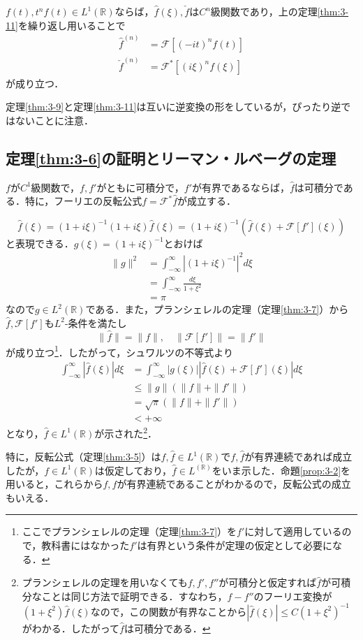 \documentclass[dvipdfmx,a4j,10pt]{jsarticle}
\makeatletter
\theoremstyle{mystyle1}
\theoremstyle{mystyle3}
\theoremstyle{mystyle4}
\theoremstyle{mystyle6}
\theoremstyle{mystyle2}
\theoremstyle{mystyle5}
\newtheorem{theorem*}{定理}
\renewenvironment{proof}[1][\proofname]{\par
  \pushQED{\qed}%
  \normalfont
  \topsep6\p@\@plus6\p@ \trivlist
  \item[\hskip\labelsep{\bfseries\sffamily #1}]\ignorespaces
}{%
  \popQED\endtrivlist\@endpefalse
}
\renewcommand\proofname{証明}
\newenvironment{thm*}[1][]
{\begin{tcolorbox}[
    enhanced,
    boxrule=0pt,
    arc=0mm,
    frame hidden,
    borderline west={2pt}{-4pt}{red},
    breakable = true
    ]
    \begin{theorem*}[#1]
}
{\end{theorem*}\end{tcolorbox}}
\makeatother
\begin{document}
$f(t),t^nf(t)\in L^1(\mathbb{R})$ならば，$\hat f(\xi),\check f$は$C^n$級関数であり，上の定理\ref{thm:3-11}を繰り返し用いることで
\[
	\begin{split}
		\hat f^{(n)}&=\mathcal{F}[(-it)^nf(t)] \\
		\check f^{(n)}&=\mathcal{F}^*[(i\xi)^n f(\xi)]
	\end{split}
\]
が成り立つ．

定理\ref{thm:3-9}と定理\ref{thm:3-11}は互いに逆変換の形をしているが，ぴったり逆ではないことに注意．


\subsection{定理\ref{thm:3-6}の証明とリーマン・ルベーグの定理}\label{sec:3-7}

\begin{thm*}
	$f$が$C^1$級関数で，$f,f'$がともに可積分で，$f'$が有界であるならば，$\hat f$は可積分である．特に，フーリエの反転公式$f=\mathcal{F}^*\hat f$が成立する．
\end{thm*}

\begin{proof}
	\[
		\hat f(\xi)	=(1+i\xi)^{-1}(1+i\xi)\hat f(\xi)=(1+i\xi)^{-1}(\hat f(\xi)+\mathcal{F}[f'](\xi))
	\]
	と表現できる．$g(\xi)=(1+i\xi)^{-1}$とおけば
	\[
		\begin{split}
			\|g\|^2&=\int_{-\infty}^\infty|(1+i\xi)^{-1}|^2d\xi \\
			&=\int_{-\infty}^\infty \frac{d\xi}{1+\xi^2} \\
			&=\pi
		\end{split}
	\]
	なので$g\in L^2(\mathbb{R})$である．また，プランシェレルの定理（定理\ref{thm:3-7}）から$\hat f,\mathcal{F}[f']$も$L^2$-条件を満たし
	\[
		\|\hat f\|=\|f\|,\quad\|\mathcal{F}[f']\|=\|f'\|
	\]
	が成り立つ\footnote{ここでプランシェレルの定理（定理\ref{thm:3-7}）を$f'$に対して適用しているので，教科書にはなかった$f'$は有界という条件が定理の仮定として必要になる．}．したがって，シュワルツの不等式より
	\[
		\begin{split}
			\int_{-\infty}^\infty|\hat f(\xi)|d\xi
			&=\int_{-\infty}^\infty |g(\xi)||\hat f(\xi)+\mathcal{F}[f'](\xi)|d\xi \\
			&\leq\|g\|(\|f\|+\|f'\|) \\
			&=\sqrt{\pi}(\|f\|+\|f'\|) \\
			&<+\infty
		\end{split}
	\]
	となり，$\hat f\in L^1(\mathbb{R})$が示された\footnote{プランシェレルの定理を用いなくても$f,f',f''$が可積分と仮定すれば$\hat f$が可積分なことは同じ方法で証明できる．すなわち，$f-f''$のフーリエ変換が$(1+\xi^2)\hat f(\xi)$なので，この関数が有界なことから$|\hat f(\xi)|\leq C(1+\xi^2)^{-1}$がわかる．したがって$\hat f$は可積分である．}．

	特に，反転公式（定理\ref{thm:3-5}）は$f,\hat f\in L^1(\mathbb{R})$で$f,\hat f$が有界連続であれば成立したが，$f\in L^1(\mathbb{R})$は仮定しており，$\hat f\in L^(\mathbb{R})$をいま示した．命題\ref{prop:3-2}を用いると，これらから$f,\hat f$が有界連続であることがわかるので，反転公式の成立もいえる．
\end{proof}
\end{document}
